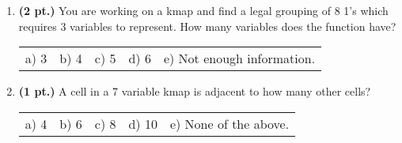 \documentclass{article}
\begin{document}
\begin{enumerate}
\begin{tabular}{ll}
\\
\end{tabular}

\vspace{0.2in} 

\item {\bf (2 pt.)} You are working on a kmap and find a legal grouping
of 8 1's which requires 3 variables to represent.  How many variables
does the function have?

\begin{tabular}{p{0.7in} p{0.7in} p{0.7in} p{0.7in} l}
a) 3 & b) 4 & c) 5 & d) 6 & e) Not enough information.
\end{tabular}


\item {\bf (1 pt.)} A cell in a 7 variable kmap is adjacent to how many other cells?

\begin{tabular}{p{0.7in} p{0.7in} p{0.7in} p{0.7in} l}
a) 4 & b) 6 & c) 8 & d) 10 & e) None of the above.
\end{tabular}


\end{enumerate}
\end{document}
